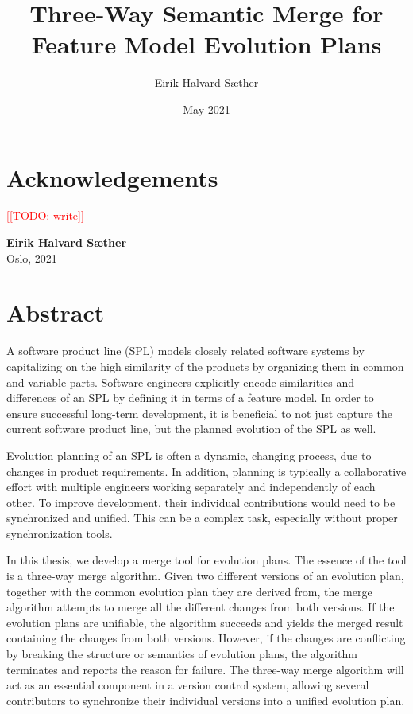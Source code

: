 \documentclass[a4paper,english]{ifimaster}
\title{Three-Way Semantic Merge for Feature Model Evolution Plans}
\date{May 2021}
\author{Eirik Halvard Sæther}
\newcommand{\todo}[1]{\textcolor{red}{[[TODO: #1]]}\PackageWarning{TODO:}{#1!}}
\begin{document}
\duoforside[dept={Department of Informatics},
program={Informatics: Programming and Systems Architecture},
long]
\frontmatter{}

\chapter*{Acknowledgements}

\todo{write}





\hfill \textbf{Eirik Halvard Sæther} \\
  \null\hfill Oslo, 2021

\newpage
\thispagestyle{empty}
\mbox{}
\chapter*{Abstract}

A software product line (SPL) models closely related software systems by capitalizing on the high similarity of the products by organizing them in common and variable parts. Software engineers explicitly encode similarities and differences of an SPL by defining it in terms of a feature model. In order to ensure successful long-term development, it is beneficial to not just capture the current software product line, but the planned evolution of the SPL as well.

Evolution planning of an SPL is often a dynamic, changing process, due to changes in product requirements. In addition, planning is typically a collaborative effort with multiple engineers working separately and independently of each other. To improve development, their individual contributions would need to be synchronized and unified. This can be a complex task, especially without proper synchronization tools.

In this thesis, we develop a merge tool for evolution plans. The essence of the tool is a three-way merge algorithm. Given two different versions of an evolution plan, together with the common evolution plan they are derived from, the merge algorithm attempts to merge all the different changes from both versions. If the evolution plans are unifiable, the algorithm succeeds and yields the merged result containing the changes from both versions. However, if the changes are conflicting by breaking the structure or semantics of evolution plans, the algorithm terminates and reports the reason for failure. The three-way merge algorithm will act as an essential component in a version control system, allowing several contributors to synchronize their individual versions into a unified evolution plan.
\end{document}
